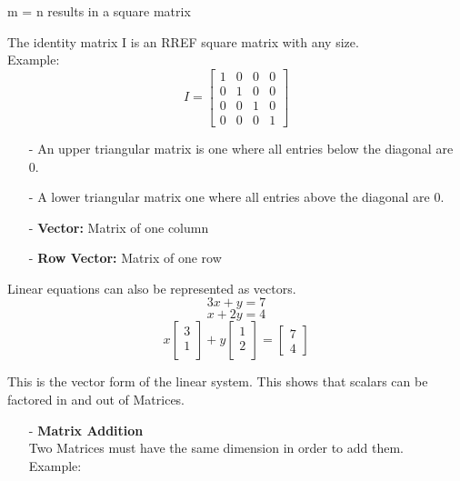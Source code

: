 \documentclass[12pt]{article}
\begin{document}
\begin{flushleft}
\begin{itemize}
\begin{center}
	 m = n results in a square matrix\\
\end{center}			
\begin{flushleft}
	The identity matrix I is an RREF square matrix with any size. \\
	Example:\\ 
	$$ I =
	\begin{bmatrix}
		1 & 0 & 0 & 0 \\ 
		0 & 1 & 0 & 0 \\
		0 & 0 & 1 & 0 \\
		0 & 0 & 0 & 1
	\end{bmatrix}
	$$
	\begin{itemize}
		\item[-] An upper triangular matrix is one where all entries below the diagonal are 0.
		\item[-] A lower triangular matrix one where all entries above the diagonal are 0.
		\item[-]  \textbf{Vector: }Matrix of one column
		\item[-]  \textbf{Row Vector: }Matrix of one row
	\end{itemize}
Linear equations can also be represented as vectors.
$$ 3x+y = 7$$
$$x+2y = 4 $$
$$ x \begin{bmatrix}3\\1\\ \end{bmatrix}
	+ y\begin{bmatrix}1\\2\\ \end{bmatrix} 
	= \begin{bmatrix}
		7 \\ 4 
	\end{bmatrix}$$
	
	This is the vector form of the linear system.
	This shows that scalars can be factored in and out of Matrices.
	
	\begin{itemize}
		\item[-] \textbf{Matrix Addition}\\
		Two Matrices must have the same dimension in order to add them.\\
		Example:
		

\end{itemize}
\end{flushleft}
\end{itemize}
\end{flushleft}
\end{document}
